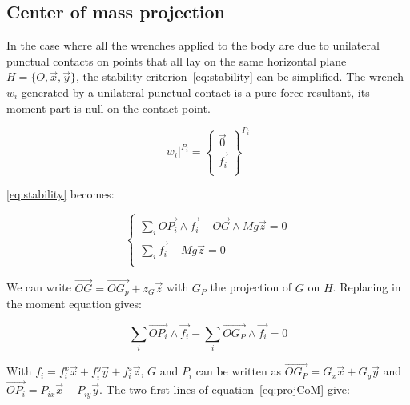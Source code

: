 \subsection{Center of mass projection}
\label{sub:center_of_mass_projection}


In the case where all the wrenches applied to the body are due to unilateral punctual contacts on points that all lay on the same horizontal plane $H = \{O, \vec{x}, \vec{y}\}$, the stability criterion~\ref{eq:stability} can be simplified.
The wrench $w_i$ generated by a unilateral punctual contact is a pure force resultant, its moment part is null on the contact point.

\begin{equation*}
    \left. w_i \right|^{P_i} =
    \left\{
      \begin{array}{r}
      \vec{0}\\
      \vec{f_i}\\
  \end{array} \right\}^{P_i}
\end{equation*}

\ref{eq:stability} becomes:

\begin{equation}
\left\{
\begin{array}{r}
  \sum\limits_i \overrightarrow{OP_i}\wedge \vec{f_i} - \overrightarrow{OG} \wedge Mg\vec{z} = 0 \\
  \sum\limits_i \vec{f_i} - Mg\vec{z} = 0 \\
\end{array}
\right.
\end{equation}

We can write $\overrightarrow{OG} = \overrightarrow{OG_p} + z_G\vec{z}$ with $G_P$ the projection of $G$ on $H$. Replacing in the moment equation gives:

\begin{equation}
  \sum\limits_i \overrightarrow{OP_i}\wedge \vec{f_i} - \sum\limits_i\overrightarrow{OG_P} \wedge \vec{f_i} = 0
\label{eq:projCoM}
\end{equation}

With $f_i = f_i^x\vec{x} + f_i^y\vec{y} + f_i^z\vec{z}$, $G$ and $P_i$ can be written as $\overrightarrow{OG_P} = G_x \vec{x} + G_y\vec{y}$ and $\overrightarrow{OP_i} = P_{ix} \vec{x} + P_{iy} \vec{y}$. The two first lines of equation~\ref{eq:projCoM} give:

